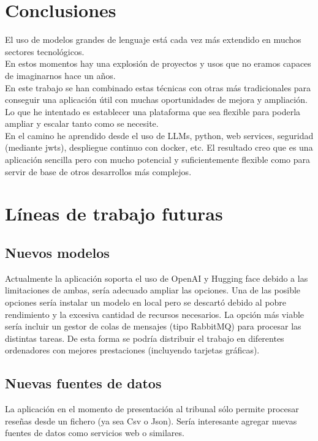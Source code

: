 
\section{Conclusiones}
El uso de modelos grandes de lenguaje está cada vez más extendido en muchos sectores tecnológicos.\\
En estos momentos hay una explosión de proyectos y usos que no eramos capaces de imaginarnos hace un años.\\
En este trabajo se han combinado estas técnicas con otras más tradicionales para 
conseguir una aplicación útil con muchas oportunidades de mejora y ampliación.\\
Lo que he intentado es establecer una plataforma que sea flexible para poderla ampliar y 
escalar tanto como se necesite.\\
En el camino he aprendido desde el uso de LLMs, python, web services, seguridad (mediante jwts), 
despliegue continuo con docker, etc.
El resultado creo que es una aplicación sencilla pero con mucho potencial y suficientemente 
flexible como para servir de base de otros desarrollos más complejos.
\newpage

\section{Líneas de trabajo futuras}

\subsection{Nuevos modelos}
Actualmente la aplicación soporta el uso de OpenAI y Hugging face debido a las limitaciones de ambas,
sería adecuado ampliar las opciones. Una de las posible opciones sería instalar un modelo en local 
pero se descartó debido al pobre rendimiento y la excesiva cantidad de recursos necesarios.
La opción más viable sería incluir un gestor de colas de mensajes (tipo RabbitMQ) para procesar las distintas tareas.
De esta forma se podría distribuir el trabajo en diferentes ordenadores con mejores prestaciones 
(incluyendo tarjetas gráficas).

\subsection{Nuevas fuentes de datos}
La aplicación en el momento de presentación al tribunal sólo permite procesar reseñas desde un fichero (ya sea Csv o Json).
Sería interesante agregar nuevas fuentes de datos como servicios web o similares.

